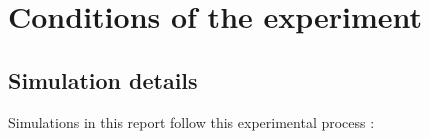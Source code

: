 

\separation
\bk







\medskip

\section{Conditions of the experiment}
\subsection{Simulation details}

Simulations in this report follow this experimental
process :
	
